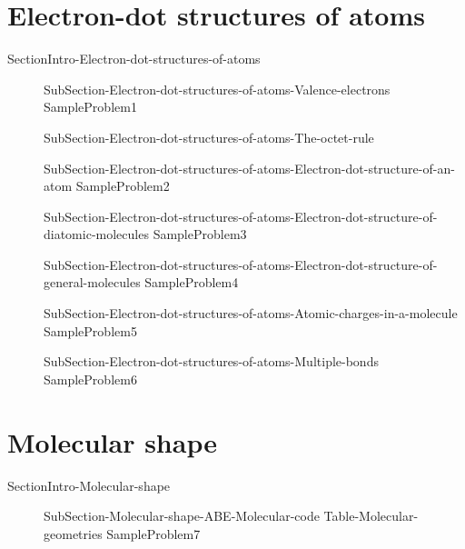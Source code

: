\documentclass[main.tex]{subfiles}
\begin{document}
\section{Electron-dot structures of atoms}{SectionIntro-Electron-dot-structures-of-atoms}
\sloppy\begin{description}
\item[] {SubSection-Electron-dot-structures-of-atoms-Valence-electrons}
{SampleProblem1}
\item[] {SubSection-Electron-dot-structures-of-atoms-The-octet-rule}
\item[] {SubSection-Electron-dot-structures-of-atoms-Electron-dot-structure-of-an-atom}
{SampleProblem2}
\item[] {SubSection-Electron-dot-structures-of-atoms-Electron-dot-structure-of-diatomic-molecules}
{SampleProblem3}
\item[] {SubSection-Electron-dot-structures-of-atoms-Electron-dot-structure-of-general-molecules}
{SampleProblem4}
\item[] {SubSection-Electron-dot-structures-of-atoms-Atomic-charges-in-a-molecule}
{SampleProblem5}
\item[] {SubSection-Electron-dot-structures-of-atoms-Multiple-bonds} 
{SampleProblem6}
\end{description}
\section{Molecular shape}{SectionIntro-Molecular-shape}
\sloppy\begin{description}
\item[] {SubSection-Molecular-shape-ABE-Molecular-code}
{Table-Molecular-geometries}
{SampleProblem7}
\end{description}
\end{document}
